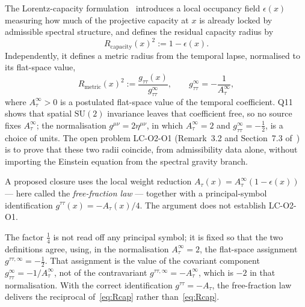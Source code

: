 \documentclass[12pt,a4paper]{article}
\theoremstyle{remark}
\theoremstyle{definition}
\begin{document}
    The Lorentz-capacity formulation~\cite{Beau2026lco2} introduces a local occupancy field
    $\epsilon(x)$ measuring how much of the projective capacity at $x$ is already locked by admissible
    spectral structure, and defines the residual capacity radius by
    \begin{equation}\label{eq:Rcap}
      R_{\mathrm{capacity}}(x)^{2} := 1-\epsilon(x).
    \end{equation}
    Independently, it defines a metric radius from the temporal lapse, normalised to its flat-space
    value,
    \begin{equation}\label{eq:Rmet}
      R_{\mathrm{metric}}(x)^{2}
      := \frac{g_{\tau\tau}(x)}{g_{\tau\tau}^{\infty}},
      \qquad
      g_{\tau\tau}^{\infty}=-\frac{1}{A_{\tau}^{\infty}} ,
    \end{equation}
    where $A_{\tau}^{\infty}>0$ is a postulated flat-space value of the temporal coefficient.
    Q11~\cite{Beau2026q11} shows that spatial $\mathrm{SU}(2)$ invariance leaves that coefficient free, so no
    source fixes $A_{\tau}^{\infty}$; the normalisation $g^{\mu\nu}=2\eta^{\mu\nu}$, in which
    $A_{\tau}^{\infty}=2$ and $g_{\tau\tau}^{\infty}=-\tfrac12$, is a choice of units.
    The open problem LC-O2-O1 (Remark~3.2 and Section~7.3 of~\cite{Beau2026lco2}) is to prove that
    these two radii coincide, from admissibility data alone, without importing the Einstein equation
    from the spectral gravity branch.

    A proposed closure uses the local weight reduction
    $A_{\tau}(x)=A_{\tau}^{\infty}(1-\epsilon(x))$ --- here called the \emph{free-fraction law} ---
    together with a principal-symbol identification $g^{\tau\tau}(x)=-A_{\tau}(x)/4$.
    The argument does not establish LC-O2-O1.

    The factor $\tfrac14$ is not read off any principal symbol; it is fixed so
    that the two definitions agree, using, in the normalisation $A_{\tau}^{\infty}=2$, the flat-space assignment
    $g^{\tau\tau,\infty}=-\tfrac12$.
    That assignment is the value of the covariant component $g_{\tau\tau}^{\infty}=-1/A_{\tau}^{\infty}$, not of
    the contravariant $g^{\tau\tau,\infty}=-A_{\tau}^{\infty}$, which is $-2$ in that normalisation.
    With the correct identification $g^{\tau\tau}=-A_{\tau}$, the free-fraction law delivers the
    reciprocal of~\eqref{eq:Rcap} rather than~\eqref{eq:Rcap}.
\end{document}
